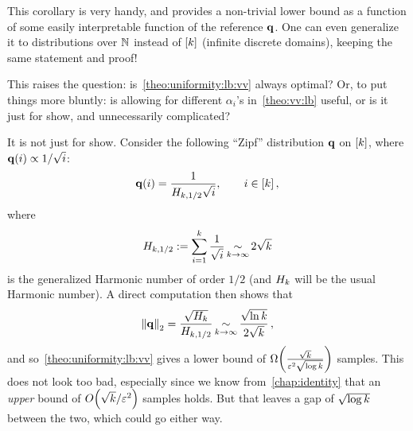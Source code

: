 This corollary is very handy, and provides a non-trivial lower bound as a function of some easily interpretable function of the reference $\mathbf{q}$. One can even generalize it to distributions over $\mathbb{N}$ instead of $[k]$ (infinite discrete domains), keeping the same statement and proof!

This raises the question: is~\cref{theo:uniformity:lb:vv} always optimal? Or, to put things more bluntly: is allowing for different $\alpha_i$'s in~\cref{theo:vv:lb} useful, or is it just for show, and unnecessarily complicated?

It is not just for show. Consider the following ``Zipf'' distribution $\mathbf{q}$ on $[k]$, where $\mathbf{q}(i) \propto 1/\sqrt{i}$:
\begin{equation}
	\mathbf{q}(i) = \frac{1}{H_{k,1/2} \sqrt{i}}, \qquad i \in [k]\,,
\end{equation}
where
\[
	H_{k,1/2} := \sum_{i=1}^k \frac{1}{\sqrt{i}} \operatorname*{\sim}_{k\to\infty} 2\sqrt{k}
\]
is the generalized Harmonic number of order $1/2$ (and $H_k$ will be the usual Harmonic number). A direct computation then shows that
\[
	\normtwo{\q} = \frac{\sqrt{H_\ab}}{H_{\ab,1/2}} \operatorname*{\sim}_{\ab\to\infty} \frac{\sqrt{\ln \ab}}{2\sqrt{\ab}}\,,
\]
and so~\cref{theo:uniformity:lb:vv} gives a lower bound of $\bigOmega{\frac{\sqrt{\ab}}{\dst^2\sqrt{\log \ab}}}$ samples. This does not look too bad, especially since we know from~\cref{chap:identity} that an \emph{upper} bound of  $\bigO{{\sqrt{\ab}}/{\dst^2}}$ samples holds. But that leaves a gap of $\sqrt{\log k}$ between the two, which could go either way.

